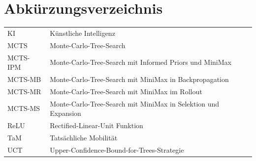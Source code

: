 \documentclass[12pt,a4paper,bibliography=totocnumbered,listof=totocnumbered]{article}
\begin{document}

\lhead{}
\section{Abkürzungsverzeichnis}
\begin{longtable}{p{3.5 cm}p{12 cm}} 
  KI & Künstliche Intelligenz \\
  MCTS & Monte-Carlo-Tree-Search \\
  MCTS-IPM & Monte-Carlo-Tree-Search mit Informed Priors und MiniMax\\
  MCTS-MB & Monte-Carlo-Tree-Search mit MiniMax in Backpropagation\\
  MCTS-MR & Monte-Carlo-Tree-Search mit MiniMax im Rollout\\
  MCTS-MS & Monte-Carlo-Tree-Search mit MiniMax in Selektion und Expansion\\
  ReLU & Rectified-Linear-Unit Funktion\\
  TaM & Tatsächliche Mobilität\\
  UCT & Upper-Confidence-Bound-for-Trees-Strategie\\
\end{longtable}
\setcounter{table}{0}
\pagebreak


\end{document}
